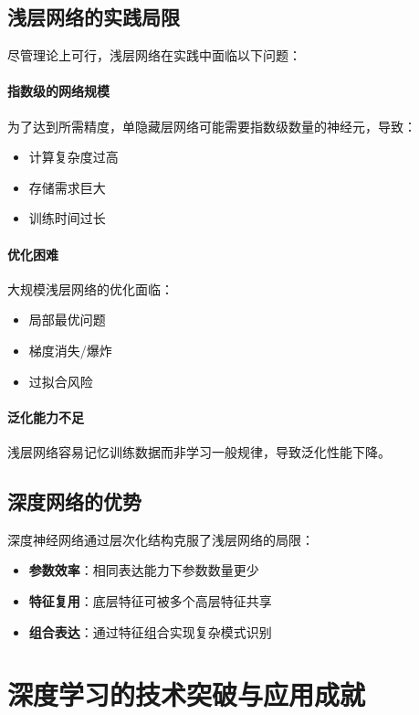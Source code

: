 \subsection{浅层网络的实践局限}

尽管理论上可行，浅层网络在实践中面临以下问题：

\paragraph{指数级的网络规模}
为了达到所需精度，单隐藏层网络可能需要指数级数量的神经元，导致：
\begin{itemize}
\item 计算复杂度过高
\item 存储需求巨大
\item 训练时间过长
\end{itemize}

\paragraph{优化困难}
大规模浅层网络的优化面临：
\begin{itemize}
\item 局部最优问题
\item 梯度消失/爆炸
\item 过拟合风险
\end{itemize}

\paragraph{泛化能力不足}
浅层网络容易记忆训练数据而非学习一般规律，导致泛化性能下降。

\subsection{深度网络的优势}

深度神经网络通过层次化结构克服了浅层网络的局限：

\begin{itemize}
\item {\bf 参数效率}：相同表达能力下参数数量更少
\item {\bf 特征复用}：底层特征可被多个高层特征共享
\item {\bf 组合表达}：通过特征组合实现复杂模式识别
\end{itemize}

\section{深度学习的技术突破与应用成就}

